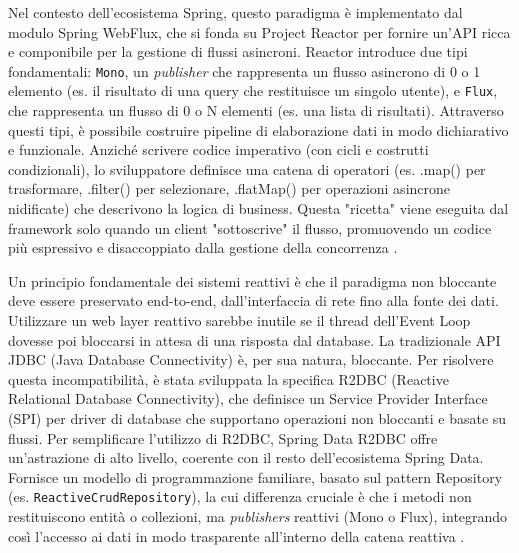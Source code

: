\documentclass[12pt,a4paper,openright,twoside]{book}
\begin{document}
Nel contesto dell'ecosistema Spring, questo paradigma è implementato dal modulo Spring WebFlux, che si fonda su Project Reactor per fornire un'API ricca e componibile per la gestione di flussi asincroni. Reactor introduce due tipi fondamentali: \texttt{Mono}, un \textit{publisher} che rappresenta un flusso asincrono di 0 o 1 elemento (es. il risultato di una query che restituisce un singolo utente), e \texttt{Flux}, che rappresenta un flusso di 0 o N elementi (es. una lista di risultati). Attraverso questi tipi, è possibile costruire pipeline di elaborazione dati in modo dichiarativo e funzionale. Anziché scrivere codice imperativo (con cicli e costrutti condizionali), lo sviluppatore definisce una catena di operatori (es. .map() per trasformare, .filter() per selezionare, .flatMap() per operazioni asincrone nidificate) che descrivono la logica di business. Questa "ricetta" viene eseguita dal framework solo quando un client "sottoscrive" il flusso, promuovendo un codice più espressivo e disaccoppiato dalla gestione della concorrenza \cite{spring_reactive}.

Un principio fondamentale dei sistemi reattivi è che il paradigma non bloccante deve essere preservato end-to-end, dall'interfaccia di rete fino alla fonte dei dati. Utilizzare un web layer reattivo sarebbe inutile se il thread dell'Event Loop dovesse poi bloccarsi in attesa di una risposta dal database. La tradizionale API JDBC (Java Database Connectivity) è, per sua natura, bloccante. Per risolvere questa incompatibilità, è stata sviluppata la specifica R2DBC (Reactive Relational Database Connectivity), che definisce un Service Provider Interface (SPI) per driver di database che supportano operazioni non bloccanti e basate su flussi. Per semplificare l'utilizzo di R2DBC, Spring Data R2DBC offre un'astrazione di alto livello, coerente con il resto dell'ecosistema Spring Data. Fornisce un modello di programmazione familiare, basato sul pattern Repository (es. \texttt{ReactiveCrudRepository}), la cui differenza cruciale è che i metodi non restituiscono entità o collezioni, ma \textit{publishers} reattivi (Mono o Flux), integrando così l'accesso ai dati in modo trasparente all'interno della catena reattiva \cite{spring_reactive}.
\end{document}
